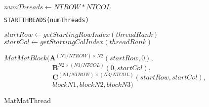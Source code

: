 \begin{algorithm}
    \footnotesize
    \SetAlgoLined


    \BlankLine
    \BlankLine
    \BlankLine

    $numThreads \gets NTROW \ast NTCOL$

    \BlankLine

    \texttt{STARTTHREADS(numThreads)}\\

    \BlankLine

    $startRow \gets getStartingRowIndex(threadRank)$ \\
    $startCol \gets getStartingColIndex(threadRank)$

    \BlankLine

    \BlankLine
    $MatMatBlock(\mathbf{A}^{(N1/NTROW) \times N2}(startRow,0),$\\
    $\qquad \qquad \qquad \quad \mathbf{B}^{N2 \times (N3/NTCOL)}(0,startCol),$\\
    $\qquad \qquad \qquad \quad \mathbf{C}^{(N1/NTROW) \times (N3/NTCOL)}(startRow,startCol),$\\
    $\qquad \qquad \qquad \quad blockN1, blockN2, blockN3)$

    \caption{MatMatThread}\label{alg:matmatthread}
\end{algorithm}
